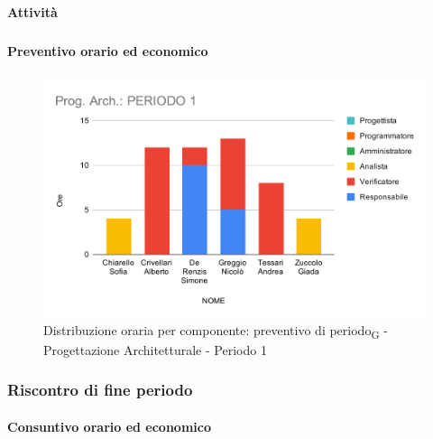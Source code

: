\paragraph{Attività}
\subparagraph*{}

\planningTable{
	
}

\paragraph{Preventivo orario ed economico}
\subparagraph*{}

\contabilitaTable{
	
}

\begin{figure}[H]
	\centering
	\includegraphics[scale=2]{res/images/charts/preventivo/prog_arch_1.png}
	\caption{Distribuzione oraria per componente: preventivo di periodo\textsubscript{G} - Progettazione Architetturale - Periodo 1}
\end{figure}


\subsubsection{Riscontro di fine periodo}


\paragraph{Consuntivo orario ed economico}
\subparagraph*{}

\contabilitaTable{
	
}

